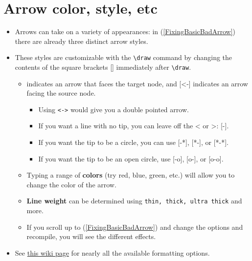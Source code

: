 \documentclass{article}
\begin{document}
\section{Arrow color, style, etc}

\begin{itemize}

\item Arrows can take on a variety of appearances: in (\ref{FixingBasicBadArrow}) there are already three distinct arrow styles. 

\item These styles are customizable with the \verb|\draw| command by changing the contents of the square brackets [] immediately after \verb|\draw|. 

\begin{itemize}

\item [->] indicates an arrow that faces the target node, and [<-] indicates an arrow facing the source node. 

\begin{itemize}

\item Using \verb|<->| would give you a double pointed arrow.

\item If you want a line with no tip, you can leave off the < or >: [-]. 

\item If you want the tip to be a circle, you can use [-*], [*-], or [*-*]. 

\item If you want the tip to be an open circle, use [-o], [o-], or [o-o].

\end{itemize}

\item Typing a range of \textbf{colors} (try red, blue, green, etc.) will allow you to change the color of the arrow. 

\item \textbf{Line weight} can be determined using \verb|thin, thick, ultra thick| and more. 

\item If you scroll up to (\ref{FixingBasicBadArrow}) and change the options and recompile, you will see the different effects.


\end{itemize}

\item See  \href{https://en.wikibooks.org/wiki/LaTeX/PGF/TikZ#Syntax_for_paths}{this wiki page} for nearly all the available formatting options.

\end{itemize}
\end{document}
